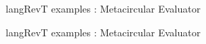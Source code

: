 \documentclass[svgnames,11pt]{beamer}
\begin{document}
\begin{frame}{ {{langRevT}} examples : Metacircular Evaluator}

\begin{center}
\end{center}

\end{frame}

\begin{frame}{ {{langRevT}} examples : Metacircular Evaluator}


\begin{center}
\end{center}

\end{frame}
\end{document}

